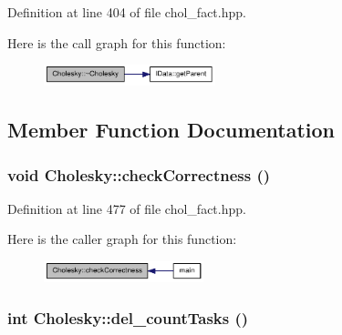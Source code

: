 Definition at line 404 of file chol\_\-fact.hpp.

Here is the call graph for this function:\nopagebreak
\begin{figure}[H]
\begin{center}
\leavevmode
\includegraphics[width=141pt]{class_cholesky_aed950ac074bea0a0df52749af3944d6a_cgraph}
\end{center}
\end{figure}


\subsection{Member Function Documentation}
\hypertarget{class_cholesky_a56a5e5399cd1dff87c123119fff14667}{
\subsubsection[{checkCorrectness}]{\setlength{\rightskip}{0pt plus 5cm}void Cholesky::checkCorrectness ()}}
\label{class_cholesky_a56a5e5399cd1dff87c123119fff14667}


Definition at line 477 of file chol\_\-fact.hpp.

Here is the caller graph for this function:\nopagebreak
\begin{figure}[H]
\begin{center}
\leavevmode
\includegraphics[width=131pt]{class_cholesky_a56a5e5399cd1dff87c123119fff14667_icgraph}
\end{center}
\end{figure}
\hypertarget{class_cholesky_a8e1c4a4d12d3989a41c09cafad8c8933}{
\subsubsection[{del\_\-countTasks}]{\setlength{\rightskip}{0pt plus 5cm}int Cholesky::del\_\-countTasks ()}}
\label{class_cholesky_a8e1c4a4d12d3989a41c09cafad8c8933}


